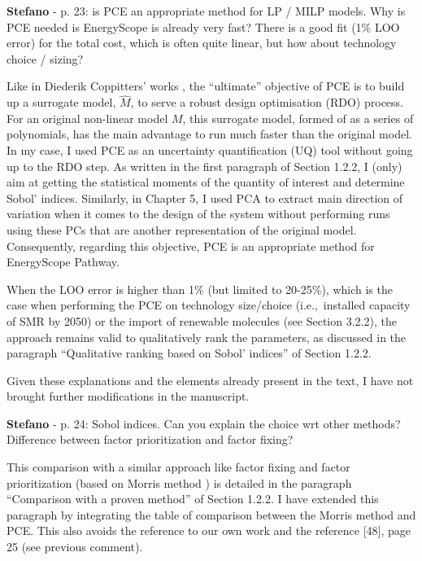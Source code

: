 \documentclass[12pt,a4paper]{article}
\def\ie{i.e.,\ }
\begin{document}
\begin{mdframed}[style=comment] %
{\color{orange} \textbf{Stefano}} - p. 23: is PCE an appropriate method for LP / MILP models. Why is PCE needed is EnergyScope is already very fast? There is a good fit (1\% LOO error) for the total cost, which is often quite linear, but how about technology choice / sizing?
\end{mdframed}

\noindent Like in Diederik Coppitters' works \cite{coppitters2021robust,coppittersthesis}, the ``ultimate'' objective of PCE is to build up a surrogate model, $\hat{M}$, to serve a robust design optimisation (RDO) process. For an original non-linear model $M$, this surrogate model, formed of as a series of polynomials,  has the main advantage to run much faster than the original model. In my case, I used PCE as an uncertainty quantification (UQ) tool without going up to the RDO step. As written {\color{blue}in the first paragraph of Section 1.2.2}, I (only) aim at getting the statistical moments of the quantity of interest and determine Sobol' indices. Similarly, in Chapter 5, I used PCA to extract main direction of variation when it comes to the design of the system without performing runs using these PCs that are another representation of the original model. Consequently, regarding this objective, PCE is an appropriate method for EnergyScope Pathway. 

\noindent When the LOO error is higher than 1\% (but limited to 20-25\%), which is the case when performing the PCE on technology size/choice (\ie installed capacity of SMR by 2050) or the import of renewable molecules (see Section 3.2.2), the approach remains valid to qualitatively rank the parameters, {\color{blue}as discussed in the paragraph ``Qualitative ranking based on Sobol' indices'' of Section 1.2.2}.

\noindent Given these explanations and the elements already present in the text, I have not brought further modifications in the manuscript.

\begin{mdframed}[style=comment] %
{\color{orange} \textbf{Stefano}} - p. 24: Sobol indices. Can you explain the choice wrt other methods? Difference between factor prioritization and factor fixing?
\end{mdframed}

\noindent This comparison with a similar approach like factor fixing and factor prioritization (based on Morris method \cite{morris_factorial_1991}) is detailed {\color{blue}in the paragraph ``Comparison with a proven method'' of Section 1.2.2}. I have extended this paragraph by integrating the table of comparison between the Morris method and PCE.  This also avoids the reference to our own work and the reference [48], page 25 (see previous comment).
\end{document}
